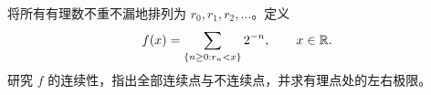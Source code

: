 将所有有理数不重不漏地排列为 $r_0,r_1,r_2,\ldots$。定义
\[
 f(x)=\sum_{\{n\ge0:r_n<x\}}2^{-n},\qquad x\in\mathbb{R}.
\]
研究 $f$ 的连续性，指出全部连续点与不连续点，并求有理点处的左右极限。
